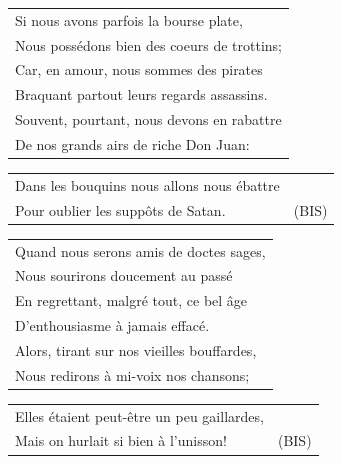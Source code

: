 \documentclass{article}
\begin{document}
\begin{flushleft}
\begin{tabularx}{\textwidth} {
    >{\raggedright\arraybackslash}X}
Si nous avons parfois la bourse plate,\\
Nous possédons bien des coeurs de trottins;\\
Car, en amour, nous sommes des pirates\\
Braquant partout leurs regards assassins.\\
Souvent, pourtant, nous devons en rabattre\\
De nos grands airs de riche Don Juan:\\
\end{tabularx}
\begin{tabularx}{\textwidth} {
    >{\raggedright\arraybackslash}X|c}
Dans les bouquins nous allons nous ébattre & \\
Pour oublier les suppôts de Satan. & (BIS)\\
\end{tabularx}
\end{flushleft}
\begin{flushleft}
\begin{tabularx}{\textwidth} {
    >{\raggedright\arraybackslash}X}
Quand nous serons amis de doctes sages,\\
Nous sourirons doucement au passé\\
En regrettant, malgré tout, ce bel âge\\
D’enthousiasme à jamais effacé.\\
Alors, tirant sur nos vieilles bouffardes,\\
Nous redirons à mi-voix nos chansons;\\
\end{tabularx}
\begin{tabularx}{\textwidth} {
    >{\raggedright\arraybackslash}X|c}
Elles étaient peut-être un peu gaillardes, & \\
Mais on hurlait si bien à l’unisson! & (BIS)\\
\end{tabularx}
\end{flushleft}
\newpage
\end{document}
